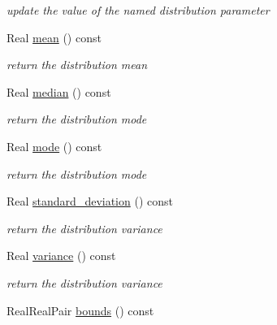 \begin{DoxyCompactItemize}
\begin{DoxyCompactList}\small\item\em update the value of the named distribution parameter \end{DoxyCompactList}\item 
Real \hyperlink{classPecos_1_1HypergeometricRandomVariable_a962ffe5a3593be370d5c883365c060f4}{mean} () const \label{classPecos_1_1HypergeometricRandomVariable_a962ffe5a3593be370d5c883365c060f4}

\begin{DoxyCompactList}\small\item\em return the distribution mean \end{DoxyCompactList}\item 
Real \hyperlink{classPecos_1_1HypergeometricRandomVariable_ae1fff19ce29a79d657043a598523635d}{median} () const \label{classPecos_1_1HypergeometricRandomVariable_ae1fff19ce29a79d657043a598523635d}

\begin{DoxyCompactList}\small\item\em return the distribution mode \end{DoxyCompactList}\item 
Real \hyperlink{classPecos_1_1HypergeometricRandomVariable_a72d3d6926edd929cb3f8e12baa655f70}{mode} () const \label{classPecos_1_1HypergeometricRandomVariable_a72d3d6926edd929cb3f8e12baa655f70}

\begin{DoxyCompactList}\small\item\em return the distribution mode \end{DoxyCompactList}\item 
Real \hyperlink{classPecos_1_1HypergeometricRandomVariable_a6a4ed9624d511f8a4e4f509c82cb0706}{standard\+\_\+deviation} () const \label{classPecos_1_1HypergeometricRandomVariable_a6a4ed9624d511f8a4e4f509c82cb0706}

\begin{DoxyCompactList}\small\item\em return the distribution variance \end{DoxyCompactList}\item 
Real \hyperlink{classPecos_1_1HypergeometricRandomVariable_a4b8b05b2a9af92dad9cc304c2925a4eb}{variance} () const \label{classPecos_1_1HypergeometricRandomVariable_a4b8b05b2a9af92dad9cc304c2925a4eb}

\begin{DoxyCompactList}\small\item\em return the distribution variance \end{DoxyCompactList}\item 
Real\+Real\+Pair \hyperlink{classPecos_1_1HypergeometricRandomVariable_a4bdb95a8fa5fffaa0de5102f56963cf2}{bounds} () const \label{classPecos_1_1HypergeometricRandomVariable_a4bdb95a8fa5fffaa0de5102f56963cf2}


\end{DoxyCompactItemize}
